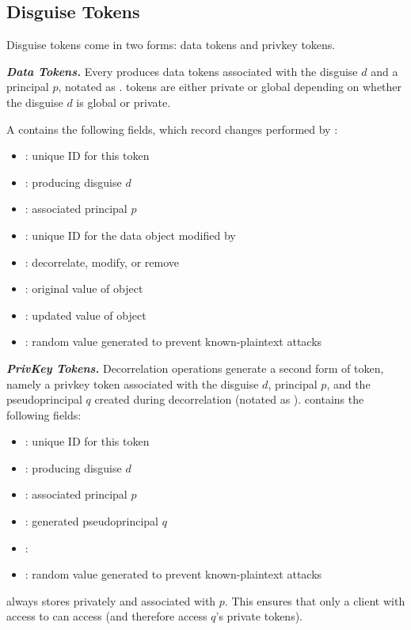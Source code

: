 \subsection{Disguise Tokens} 
Disguise tokens come in two forms: data tokens and privkey tokens.

\vspace{6pt}
\noindent\textbf{\emph{Data Tokens.}}
Every  produces data tokens associated with the disguise $d$ and a
principal $p$, notated as .  tokens are either private or global depending on
whether the disguise $d$ is global or private. 

A  contains the following fields, which record changes performed by :
\begin{itemize}
\item {}: unique ID for this token
\item {}: producing disguise $d$ 
\item {}: associated principal $p$
\item {}: unique ID for the data object modified by 
\item {}: decorrelate, modify, or remove
\item {}: original value of object 
\item {}: updated value of object 
\item {}: random value generated to prevent known-plaintext attacks
\end{itemize}

\noindent\textbf{\emph{PrivKey Tokens.}}
Decorrelation operations generate a second form of token, namely a privkey token associated with the disguise $d$, principal $p$, and the pseudoprincipal $q$ created
during decorrelation (notated as ).
 contains the following fields:
\begin{itemize}
\item {}: unique ID for this token
\item {}: producing disguise $d$ 
\item {}: associated principal $p$
\item {}: generated pseudoprincipal $q$
\item {}: 
\item {}: random value generated to prevent known-plaintext attacks
\end{itemize}
\sys always stores  privately and associated with $p$. This ensures that only a client
with access to  can access  (and therefore access $q$'s private tokens).

